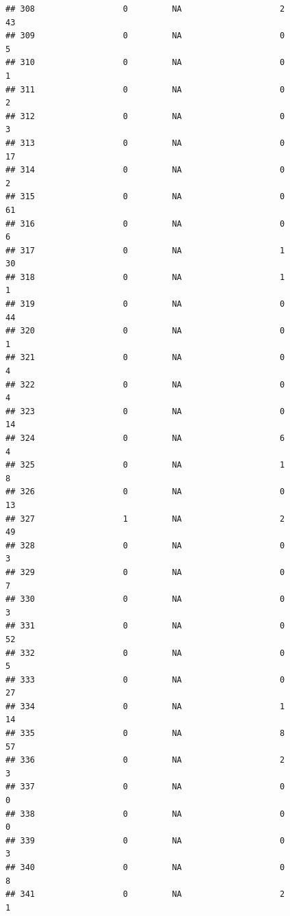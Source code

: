 \documentclass[
]{article}
\begin{document}
\begin{verbatim}
## 308                  0         NA                    2                 43
## 309                  0         NA                    0                  5
## 310                  0         NA                    0                  1
## 311                  0         NA                    0                  2
## 312                  0         NA                    0                  3
## 313                  0         NA                    0                 17
## 314                  0         NA                    0                  2
## 315                  0         NA                    0                 61
## 316                  0         NA                    0                  6
## 317                  0         NA                    1                 30
## 318                  0         NA                    1                  1
## 319                  0         NA                    0                 44
## 320                  0         NA                    0                  1
## 321                  0         NA                    0                  4
## 322                  0         NA                    0                  4
## 323                  0         NA                    0                 14
## 324                  0         NA                    6                  4
## 325                  0         NA                    1                  8
## 326                  0         NA                    0                 13
## 327                  1         NA                    2                 49
## 328                  0         NA                    0                  3
## 329                  0         NA                    0                  7
## 330                  0         NA                    0                  3
## 331                  0         NA                    0                 52
## 332                  0         NA                    0                  5
## 333                  0         NA                    0                 27
## 334                  0         NA                    1                 14
## 335                  0         NA                    8                 57
## 336                  0         NA                    2                  3
## 337                  0         NA                    0                  0
## 338                  0         NA                    0                  0
## 339                  0         NA                    0                  3
## 340                  0         NA                    0                  8
## 341                  0         NA                    2                  1

\end{verbatim}
\end{document}
